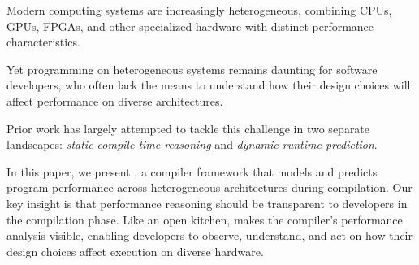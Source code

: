 Modern computing systems are increasingly heterogeneous, combining CPUs, GPUs, FPGAs, and other specialized hardware with distinct performance characteristics.

Yet programming on heterogeneous systems remains daunting for software developers,  who often lack the means to understand how their design choices will affect performance on diverse architectures.

Prior work has largely attempted to tackle this challenge in two separate landscapes:
\textit{static compile-time reasoning} and \textit{dynamic runtime prediction}.

In this paper, we present \sysname{}, a compiler framework that models and predicts program performance across heterogeneous architectures during compilation.
Our key insight is that performance reasoning should be transparent to developers in the compilation phase.
Like an open kitchen, \sysname{} makes the compiler's performance analysis visible, enabling developers to observe, understand, and act on how their design choices affect execution on diverse hardware.